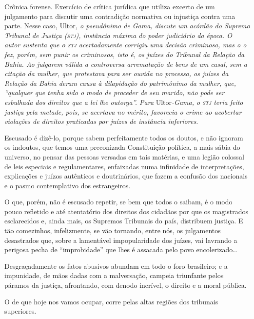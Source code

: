 \begin{didascalia}
Crônica forense. Exercício de crítica jurídica que utiliza excerto de um
julgamento para discutir uma contradição normativa ou injustiça contra
uma parte. Nesse caso, Ultor\emph{, o pseudônimo de Gama, discute um
acórdão do Supremo Tribunal de Justiça (\textsc{stj}), instância máxima do poder
judiciário da época. O autor sustenta que o \textsc{stj} acertadamente corrigiu
uma decisão criminosa, mas o o fez, porém, sem punir os criminosos, isto
é, os juízes do Tribunal da Relação da Bahia. Ao julgarem válida a
controversa arrematação de bens de um casal, sem a citação da mulher,
que protestava para ser ouvida no processo, os juízes da Relação da
Bahia deram causa à dilapidação do patrimônimo da mulher, que, ``qualquer
que tenha sido o modo de proceder de seu marido, não pode ser esbulhada
dos direitos que a lei lhe outorga''. Para} Ultor\emph{-Gama, o \textsc{stj} teria
feito justiça pela metade, pois, se acertava no mérito, favorecia o
crime ao acobertar violações de direitos praticadas por juízes de
instância inferiores.}
\end{didascalia}



Escusado é dizê-lo, porque sabem perfeitamente todos os doutos, e não
ignoram os indoutos, que temos uma preconizada Constituição política, a
mais sábia do universo, no pensar das pessoas versadas em tais matérias,
e uma legião colossal de leis especiais e regulamentares, enfaixadas
numa infinidade de interpretações, explicações e juízos autênticos e
doutrinários, que fazem a confusão dos nacionais e o pasmo contemplativo
dos estrangeiros.

O que, porém, não é escusado repetir, se bem que todos o saibam, é o
modo pouco refletido e até atentatório dos direitos dos cidadãos por que
os magistrados esclarecidos e, ainda mais, os Supremos Tribunais do
país, distribuem justiça. E tão comezinhos, infelizmente, se vão
tornando, entre nós, os julgamentos desastrados que, sobre a lamentável
impopularidade dos juízes, vai lavrando a perigosa pecha de
``improbidade'' que lhes é assacada pelo povo encolerizado\ldots{}

Desgraçadamente os fatos abusivos abundam em todo o foro brasileiro; e a
impunidade, de mãos dadas com a malversação, campeia triunfante pelos
páramos da justiça, afrontando, com denodo incrível, o direito e a moral
pública.

O de que hoje nos vamos ocupar, corre pelas altas regiões dos tribunais
superiores.

